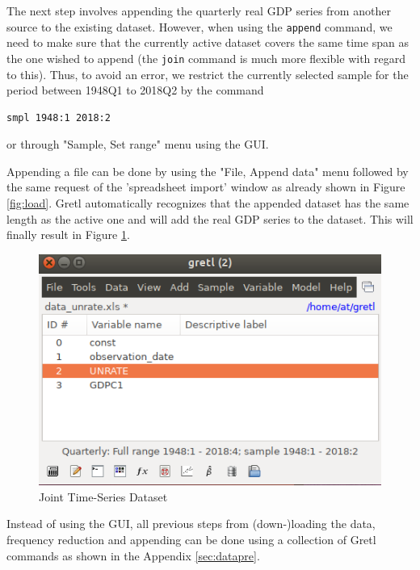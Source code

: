 \documentclass[11pt]{article}
\begin{document}
The next step involves appending the quarterly real GDP series from another source to the existing dataset. However, when using the \texttt{append} command, we need to make sure that the currently active dataset covers the same time span as the one wished to append (the \texttt{join} command is much more flexible with regard to this). Thus, to avoid an error, we restrict the currently selected sample for the period between 1948Q1 to 2018Q2 by the command
\begin{verbatim}
smpl 1948:1 2018:2
\end{verbatim}
or through "Sample, Set range" menu using the GUI.

Appending a file can be done by using the "File, Append data" menu followed by the same request of the 'spreadsheet import' window as already shown in Figure \ref{fig:load}. Gretl automatically recognizes that the appended dataset has the same length as the active one and will add the real GDP series to the dataset. This will finally result in Figure \ref{fig:append}.

\begin{figure}[!h]
	\centering
	\includegraphics[width=.42\textwidth]{../figures/gretl_after_appending}
	\caption{Joint Time-Series Dataset}
	\label{fig:append}
\end{figure}

Instead of using the GUI, all previous steps from (down-)loading the data, frequency reduction and appending can be done using a collection of Gretl commands as shown in the Appendix \ref{sec:datapre}.
\end{document}
